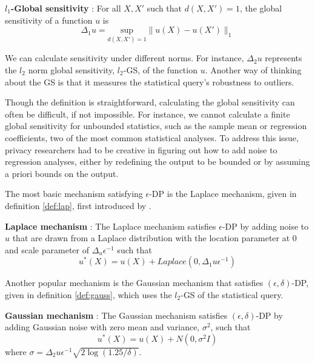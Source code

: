 \begin{defn}\label{def:gs} \textbf{$l_1$-Global sensitivity} \citep{dwork2006calibrating}:
For all $X,X'$ such that $d(X,X')=1$, the global sensitivity of a function $u$ is
    \begin{equation}\label{eqn:gs}
        \Delta_1 u= \underset{d(X,X')=1}{\text{sup}} \|u(X)-u(X') \|_1 
    \end{equation}
\end{defn}

We can calculate sensitivity under different norms. For instance, $\Delta_2 u$ represents the $l_2$ norm global sensitivity, $l_2$-GS, of the function $u$. Another way of thinking about the GS is that it measures the statistical query's robustness to outliers.

Though the definition is straightforward, calculating the global sensitivity can often be difficult, if not impossible. For instance, we cannot calculate a finite global sensitivity for unbounded statistics, such as the sample mean or regression coefficients, two of the most common statistical analyses. To address this issue, privacy researchers had to be creative in figuring out how to add noise to regression analyses, either by redefining the output to be bounded or by assuming a priori bounds on the output.

The most basic mechanism satisfying $\epsilon$-DP is the Laplace mechanism, given in definition \ref{def:lap}, first introduced by \citet{dwork2006calibrating}.

\begin{defn}\textbf{Laplace mechanism} \citep{dwork2006calibrating}: \label{def:lap}
The Laplace mechanism satisfies $\epsilon$-DP by adding noise to $u$ that are drawn from a Laplace distribution with the location parameter at 0 and scale parameter of $\Delta_u\epsilon^{-1}$ such that 
    \begin{equation}\label{eqn:lap}
        u^\ast(X)=u(X)+Laplace\left(0,\Delta_1 u \epsilon^{-1}\right)
    \end{equation}
\end{defn}

Another popular mechanism is the Gaussian mechanism that satisfies $(\epsilon, \delta)$-DP, given in definition \ref{def:gauss}, which uses the $l_2$-GS of the statistical query.

\begin{defn}\label{def:gauss} \textbf{Gaussian mechanism} \citep{dwork2014algorithmic}:
    The Gaussian mechanism satisfies $(\epsilon,\delta)$-DP by adding Gaussian noise with zero mean and variance, $\sigma^2$, such that
        \begin{equation}\label{eqn:gauss}
            u^\ast(X)=u(X)+N\left(0, \sigma^2 I \right)
        \end{equation}
    where $\sigma=\Delta_2 u \epsilon^{-1} \sqrt{2 \log(1.25/\delta)}$. 
\end{defn}

